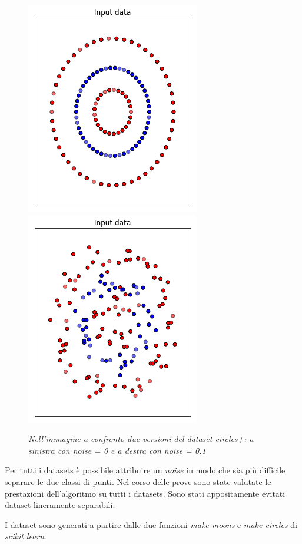 \documentclass[12pt,a4paper]{report}
\begin{document}
\begin{figure}[H]
 \centering
 \includegraphics[scale = 0.5]{images/circles+_nonoise}
 \includegraphics[scale = 0.5]{images/circles+_noise}
 \caption{\textit {Nell'immagine a confronto due versioni del dataset circles+: a sinistra con noise = 0 e a destra con noise = 0.1 }}
 \label{circles+}
\end{figure}

Per tutti i datasets è possibile attribuire un \textit{noise} in modo che sia più difficile separare le due classi di punti.
Nel corso delle prove sono state valutate le prestazioni dell'algoritmo su tutti i datasets.
Sono stati appositamente evitati dataset lineramente separabili.

I dataset sono generati a partire dalle due funzioni \textit{make moons} e \textit{make circles} di \textit{scikit learn}.
\end{document}

